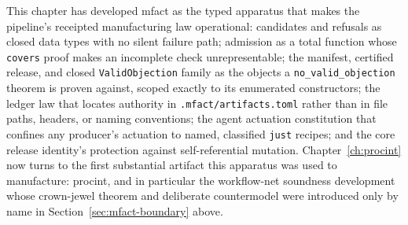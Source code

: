 This chapter has developed \textsf{mfact} as the typed apparatus that
makes the pipeline's receipted manufacturing law operational: candidates
and refusals as closed data types with no silent failure path;
admission as a total function whose \texttt{covers} proof makes an
incomplete check unrepresentable; the manifest, certified release, and
closed \texttt{ValidObjection} family as the objects a
\texttt{no\_valid\_objection} theorem is proven against, scoped exactly
to its enumerated constructors; the ledger law that locates authority in
\texttt{.mfact/artifacts.toml} rather than in file paths, headers, or
naming conventions; the agent actuation constitution that confines any
producer's actuation to named, classified \texttt{just} recipes; and the
core release identity's protection against self-referential mutation.
Chapter~\ref{ch:procint} now turns to the first substantial artifact
this apparatus was used to manufacture: \textsf{procint}, and in
particular the workflow-net soundness development whose crown-jewel
theorem and deliberate countermodel were introduced only by name in
Section~\ref{sec:mfact-boundary} above.
